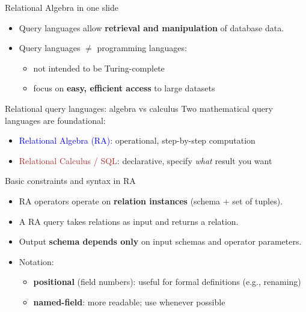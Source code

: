 \documentclass[10pt,aspectratio=169]{beamer}
\begin{document}
\begin{frame}{Relational Algebra in one slide}
\begin{itemize}
  \item Query languages allow \textbf{retrieval and manipulation} of database data.
  \item Query languages \(\neq\) programming languages:
  \begin{itemize}
    \item not intended to be Turing-complete
    \item focus on \textbf{easy, efficient access} to large datasets
  \end{itemize}
\end{itemize}
\end{frame}

\begin{frame}{Relational query languages: algebra vs calculus}
Two mathematical query languages are foundational:
\begin{itemize}
  \item \textcolor{blue}{Relational Algebra (RA)}: operational, step-by-step computation
  \item \textcolor{brown}{Relational Calculus / SQL}: declarative, specify \emph{what} result you want
\end{itemize}
\end{frame}

\begin{frame}{Basic constraints and syntax in RA}
\begin{itemize}
  \item RA operators operate on \textbf{relation instances} (schema + set of tuples).
  \item A RA query takes relations as input and returns a relation.
  \item Output \textbf{schema depends only} on input schemas and operator parameters.
  \item Notation:
  \begin{itemize}
    \item \textbf{positional} (field numbers): useful for formal definitions (e.g., renaming)
    \item \textbf{named-field}: more readable; use whenever possible
  \end{itemize}
\end{itemize}
\end{frame}
\end{document}
